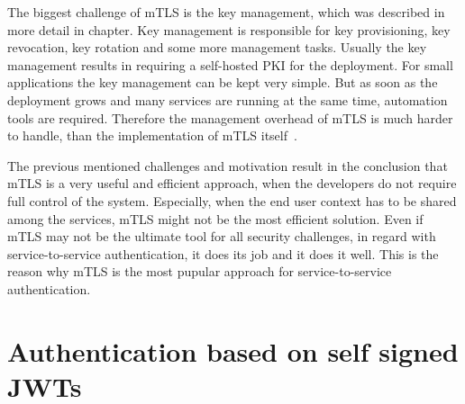 
The biggest challenge of mTLS is the key management, which was described in more detail in chapter.
Key management is responsible for key provisioning, key revocation, key rotation and some more management tasks.
Usually the key management results in requiring a self-hosted PKI for the deployment.
For small applications the key management can be kept very simple.
But as soon as the deployment grows and many services are running at the same time, automation tools are required.
Therefore the management overhead of mTLS is much harder to handle, than the implementation of mTLS itself~\cite{dias2020microservices}.

The previous mentioned challenges and motivation result in the conclusion that mTLS is a very useful and efficient approach, when the developers do not require full control of the system.
Especially, when the end user context has to be shared among the services, mTLS might not be the most efficient solution.
Even if mTLS may not be the ultimate tool for all security challenges, in regard with service-to-service authentication, it does its job and it does it well.
This is the reason why mTLS is the most pupular approach for service-to-service authentication.

\section{Authentication based on self signed JWTs}
